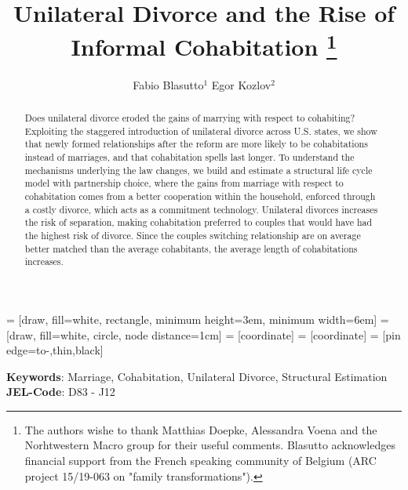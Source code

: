 \documentclass[12pt]{article}
\title{Unilateral Divorce and the Rise of Informal Cohabitation	\thanks{The authors wishe to thank Matthias Doepke, Alessandra Voena and the Norhtwestern Macro group for their useful comments. Blasutto acknowledges financial support from the French speaking community of Belgium (ARC project 15/19-063 on "family transformations").}}
\author{Fabio Blasutto$^1$ \quad Egor Kozlov$^2$}
\numberwithin{table}{section}
\begin{document}
	 	 = [draw, fill=white, rectangle, 
	minimum height=3em, minimum width=6em]
	 = [draw, fill=white, circle, node distance=1cm]
	 = [coordinate]
	 = [coordinate]
	 = [pin edge={to-,thin,black}]
	
	
	
	
	\maketitle

	
\begin{abstract}
	Does unilateral divorce eroded the gains of marrying with respect to cohabiting? Exploiting the staggered introduction of unilateral divorce across U.S. states, we show that newly formed relationships after the reform are more likely to be cohabitations instead of marriages, and that cohabitation spells last longer. To understand the mechanisms underlying the law changes, we build and estimate a structural life cycle model with partnership choice, where the gains from marriage with respect to cohabitation comes from a better cooperation within the household, enforced through a costly divorce, which acts as a commitment technology. Unilateral divorces increases the risk of separation, making cohabitation preferred to couples that would have had the highest risk of divorce. Since the couples switching relationship are on average better matched than the average cohabitants, the average length of cohabitations increases.
\end{abstract}
\textbf{Keywords}: Marriage, Cohabitation, Unilateral Divorce, Structural Estimation\\
\textbf{JEL-Code}: D83 - J12
\end{document}
